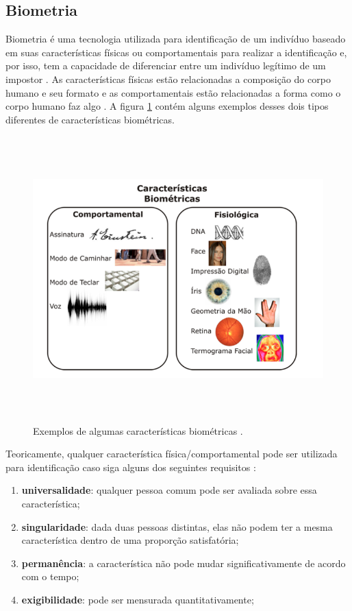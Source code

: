 \subsection{Biometria}
Biometria é uma tecnologia utilizada para identificação de um indivíduo baseado em suas características físicas ou comportamentais para realizar a identificação e, por isso, tem a capacidade de diferenciar entre um indivíduo legítimo de um impostor \cite{hong}. As características físicas estão relacionadas a composição do corpo humano e seu formato e as comportamentais estão relacionadas a forma como o corpo humano faz algo \cite{drovetto}. A figura \ref{caracteristicasBiometricas} contém alguns exemplos desses dois tipos diferentes de características biométricas.

	\begin{figure}[hbt]
		\begin{center}
			\includegraphics[height=11cm,width=17cm]{figuras/2.FundamentacaoTeorica/caracteristicasBiometricas.png}
		\end{center}
		\caption{Exemplos de algumas características biométricas \cite{drovetto}.}
		\label{caracteristicasBiometricas}
	\end{figure}

Teoricamente, qualquer característica física/comportamental pode ser utilizada para identificação caso siga alguns dos seguintes requisitos \cite{milene}: 

	\begin{enumerate}
		\item \textbf{universalidade}: qualquer pessoa comum pode ser avaliada sobre essa característica;
		\item \textbf{singularidade}: dada duas pessoas distintas, elas não podem ter a mesma característica dentro de uma proporção satisfatória;
		\item \textbf{permanência}: a característica não pode mudar significativamente de acordo com o tempo;
		\item \textbf{exigibilidade}: pode ser mensurada quantitativamente;
	\end{enumerate}

